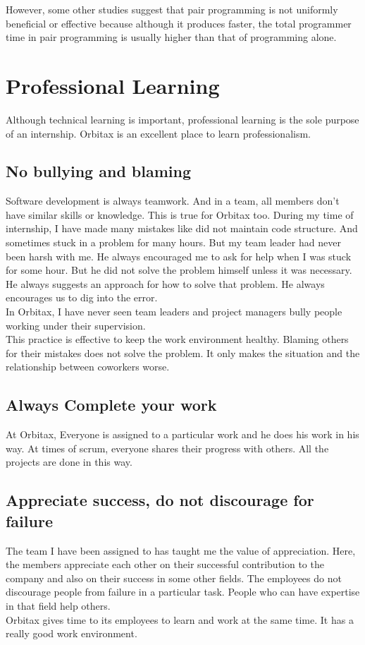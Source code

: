 \begin{flushleft}
However, some other studies suggest that pair programming is not uniformly beneficial or effective because although it produces faster, the total programmer time in pair programming is usually higher than that of programming alone.



\section{Professional Learning}
Although technical learning is important, professional learning is the sole purpose of an internship. Orbitax is an excellent place to learn professionalism.

\subsection{No bullying and blaming}
Software development is always teamwork. And in a team, all members don't have similar skills or knowledge. This is true for Orbitax too. During my time of internship, I have made many mistakes like did not maintain code structure. And sometimes stuck in a problem for many hours. But my team leader had never been harsh with me. He always encouraged me to ask for help when I was stuck for some hour. But he did not solve the problem himself unless it was necessary. He always suggests an approach for how to solve that problem. He always encourages us to dig into the error. \\ 
In Orbitax,  I have never seen team leaders and project managers bully people working under their supervision.  \\ 
This practice is effective to keep the work environment healthy. Blaming others for their mistakes does not solve the problem. It only makes the situation and the relationship between coworkers worse.



\subsection{Always Complete your work}
At Orbitax, Everyone is assigned to a particular work and he does his work in his way. At times of scrum, everyone shares their progress with others. All the projects are done in this way. 

\subsection{ Appreciate success, do not discourage for failure}
 The team I have been assigned to has taught me the value of appreciation. Here, the members appreciate each other on their successful contribution to the company and also on their success in some other fields.  
The employees do not discourage people from failure in a particular task. People who can have expertise in that field help others. \\ 
Orbitax gives time to its employees to learn and work at the same time. It has a really good work environment.


\end{flushleft}
